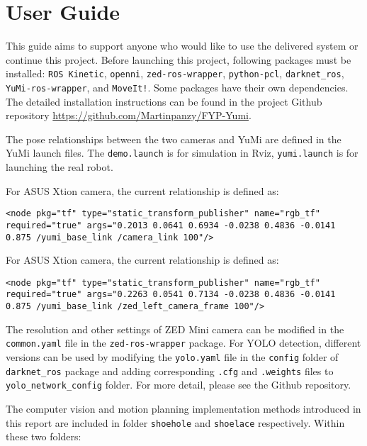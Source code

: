 \chapter{User Guide}
This guide aims to support anyone who would like to use the delivered system or continue this project. Before launching this project, following packages must be installed: \texttt{ROS Kinetic}, \texttt{openni}, \texttt{zed-ros-wrapper}, \texttt{python-pcl}, \texttt{darknet\_ros}, \texttt{YuMi-ros-wrapper}, and \texttt{MoveIt!}. Some packages have their own dependencies. The detailed installation instructions can be found in the project Github repository \url{https://github.com/Martinpanzy/FYP-Yumi}.

The pose relationships between the two cameras and YuMi are defined in the YuMi launch files. The \texttt{demo.launch} is for simulation in Rviz, \texttt{yumi.launch} is for launching the real robot. 

For ASUS Xtion camera, the current relationship is defined as:
\begin{verbatim}
<node pkg="tf" type="static_transform_publisher" name="rgb_tf" required="true" args="0.2013 0.0641 0.6934 -0.0238 0.4836 -0.0141 0.875 /yumi_base_link /camera_link 100"/>
\end{verbatim}

For ASUS Xtion camera, the current relationship is defined as:
\begin{verbatim}
<node pkg="tf" type="static_transform_publisher" name="rgb_tf" required="true" args="0.2263 0.0541 0.7134 -0.0238 0.4836 -0.0141 0.875 /yumi_base_link /zed_left_camera_frame 100"/>
\end{verbatim}

The resolution and other settings of ZED Mini camera can be modified in the \texttt{common.yaml} file in the \texttt{zed-ros-wrapper} package. For YOLO detection, different versions can be used by modifying the \texttt{yolo.yaml} file in the \texttt{config} folder of \texttt{darknet\_ros} package and adding corresponding \texttt{.cfg} and \texttt{.weights} files to \texttt{yolo\_network\_config} folder. For more detail, please see the Github repository.

The computer vision and motion planning implementation methods introduced in this report are included in folder \texttt{shoehole} and \texttt{shoelace} respectively. Within these two folders:

